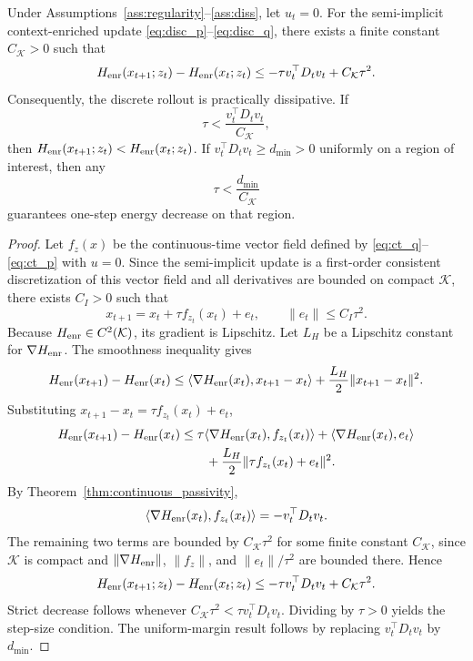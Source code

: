 \begin{theorem}
\label{thm:discrete_passivity}
Under Assumptions~\ref{ass:regularity}--\ref{ass:diss}, let \(u_t=0\).
For the semi-implicit context-enriched update \eqref{eq:disc_p}--\eqref{eq:disc_q}, there
exists a finite constant \(C_{\mathcal K}>0\) such that
\[
    H_{\rm enr}(x_{t+1};z_t)-H_{\rm enr}(x_t;z_t)
    \le
    -\tau v_t^\top D_tv_t+C_{\mathcal K}\tau^2 .
\]
Consequently, the discrete rollout is practically dissipative. If
\[
    \tau < \frac{v_t^\top D_tv_t}{C_{\mathcal K}},
\]
then \(H_{\rm enr}(x_{t+1};z_t)<H_{\rm enr}(x_t;z_t)\). If
\(v_t^\top D_tv_t\ge d_{\min}>0\) uniformly on a region of interest, then any
\[
    \tau < \frac{d_{\min}}{C_{\mathcal K}}
\]
guarantees one-step energy decrease on that region.
\end{theorem}

\begin{proof}
Let \(f_z(x)\) be the continuous-time vector field defined by
\eqref{eq:ct_q}--\eqref{eq:ct_p} with \(u=0\). Since the semi-implicit update is a
first-order consistent discretization of this vector field and all derivatives are bounded
on compact \(\mathcal K\), there exists \(C_I>0\) such that
\[
    x_{t+1}=x_t+\tau f_{z_t}(x_t)+e_t,
    \qquad
    \|e_t\|\le C_I\tau^2 .
\]
Because \(H_{\rm enr}\in C^2(\mathcal K)\), its gradient is Lipschitz. Let \(L_H\) be a
Lipschitz constant for \(\nabla H_{\rm enr}\). The smoothness inequality gives
\[
    H_{\rm enr}(x_{t+1})-H_{\rm enr}(x_t)
    \le
    \langle\nabla H_{\rm enr}(x_t),x_{t+1}-x_t\rangle
    +
    \frac{L_H}{2}\|x_{t+1}-x_t\|^2 .
\]
Substituting \(x_{t+1}-x_t=\tau f_{z_t}(x_t)+e_t\),
\begin{align*}
    H_{\rm enr}(x_{t+1})-H_{\rm enr}(x_t)
    &\le
    \tau\langle\nabla H_{\rm enr}(x_t),f_{z_t}(x_t)\rangle
    +
    \langle\nabla H_{\rm enr}(x_t),e_t\rangle  \\
    &\qquad
    +
    \frac{L_H}{2}\|\tau f_{z_t}(x_t)+e_t\|^2 .
\end{align*}
By Theorem~\ref{thm:continuous_passivity},
\[
    \langle\nabla H_{\rm enr}(x_t),f_{z_t}(x_t)\rangle
    =
    -v_t^\top D_tv_t .
\]
The remaining two terms are bounded by \(C_{\mathcal K}\tau^2\) for some finite
constant \(C_{\mathcal K}\), since \(\mathcal K\) is compact and
\(\|\nabla H_{\rm enr}\|\), \(\|f_z\|\), and \(\|e_t\|/\tau^2\) are bounded there. Hence
\[
    H_{\rm enr}(x_{t+1};z_t)-H_{\rm enr}(x_t;z_t)
    \le
    -\tau v_t^\top D_tv_t+C_{\mathcal K}\tau^2 .
\]
Strict decrease follows whenever
\(C_{\mathcal K}\tau^2<\tau v_t^\top D_tv_t\). Dividing by \(\tau>0\) yields the
step-size condition. The uniform-margin result follows by replacing
\(v_t^\top D_tv_t\) by \(d_{\min}\).
\end{proof}

